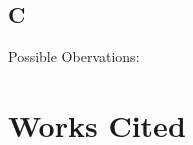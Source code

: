 \documentclass[12]{extarticle}
\begin{document}
\subsection{C}

Possible Obervations:



\section{Works Cited}
\end{document}

